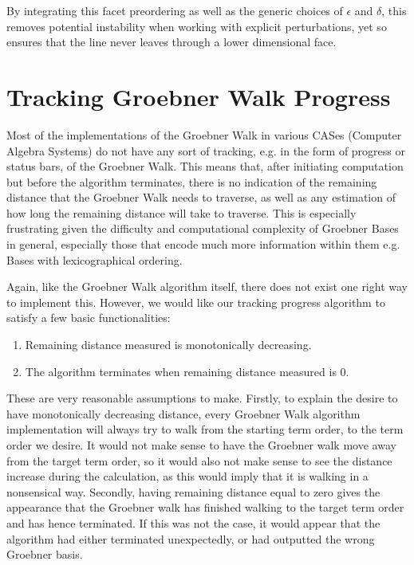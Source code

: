 \documentclass[12pt,a4paper]{report}
\begin{document}
By integrating this facet preordering as well as the generic choices of $\epsilon$ and $\delta$, this removes potential instability when working with explicit perturbations, yet so ensures that the line never leaves through a lower dimensional face.


\chapter{Tracking Groebner Walk Progress}
Most of the implementations of the Groebner Walk in various CASes (Computer Algebra Systems) do not have any sort of tracking, e.g. in the form of progress or status bars, of the Groebner Walk. This means that, after initiating computation but before the algorithm terminates, there is no indication of the remaining distance that the Groebner Walk needs to traverse, as well as any estimation of how long the remaining distance will take to traverse. This is especially frustrating given the difficulty and computational complexity of Groebner Bases in general, especially those that encode much more information within them e.g. Bases with lexicographical ordering.

Again, like the Groebner Walk algorithm itself, there does not exist one right way to implement this. However, we would like our tracking progress algorithm to satisfy a few basic functionalities:

\begin{enumerate}
    \item Remaining distance measured is  monotonically decreasing.
    \item The algorithm terminates when remaining distance measured is 0.
\end{enumerate}

These are very reasonable assumptions to make. Firstly, to explain the desire to have monotonically decreasing distance, every Groebner Walk algorithm implementation will always try to walk from the starting term order, to the term order we desire. It would not make sense to have the Groebner walk move away from the target term order, so it would also not make sense to see the distance increase during the calculation, as this would imply that it is walking in a nonsensical way. Secondly, having remaining distance equal to zero gives the appearance that the Groebner walk has finished walking to the target term order and has hence terminated. If this was not the case, it would appear that the algorithm had either terminated unexpectedly, or had outputted the wrong Groebner basis.
\end{document}
